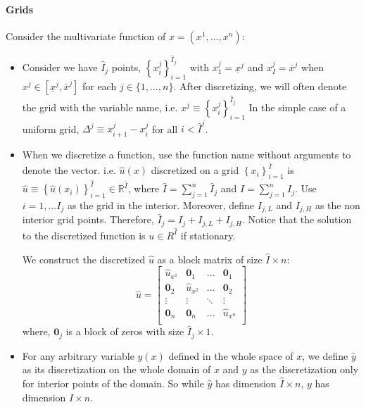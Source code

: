 \documentclass[11pt]{article}
\newcommand{\set}[1]{\ensuremath{\left\{{#1}\right\}}}
\newcommand{\R}{\ensuremath{\mathbb{R}}}
\begin{document}
	\paragraph{Grids}Consider the multivariate function of $x = (x^1,...,x^n )$:
	\begin{itemize}
		\item Consider we have $\hat{I}_j$ points, $\set{x^j_i}_{i=1}^{\hat{I}_j}$%
		 with $x^j_1 = \underline{x}^j$ and $x^j_I = \bar{x}^j$ when $x^j \in [\underline{x}^j, \bar{x}^j]$ for each $j \in \{1,...,n\}$.  After discretizing, we will often denote the grid with the variable name, i.e. $x^j \equiv \set{x^j_i}_{i=1}^{\hat{I}_j}$
		In the simple case of a uniform grid, $\Delta^j \equiv x_{i+1}^j - x_i^j$ for all $i < \hat{I}^j$.
		\item When we discretize a function, use the function name without arguments to denote the vector.  i.e. $\hat{u}(x)$ discretized on a grid $\set{x_i}_{i=1}^{\hat{I}}$  is $\hat{u} \equiv \set{\hat{u}(x_i)}_{i=1}^{\hat{I}} \in \R^{\hat{I}}$, where $\hat{I} = \sum_{j=1}^n \hat{I}_j$ and $I = \sum_{j = 1}^n I_j$.
		Use $i=1,... I_j$ as the grid in the interior. Moreover, define $I_{j,L}$ and $I_{j,H}$ as the non interior grid points. Therefore, $\hat{I}_j = I_j + I_{j,L} + I_{j,H}$. %
		 Notice that the solution to the discretized function is $u \in R^{\hat{I}}$ if stationary.
		
		We construct the discretized $\hat{u}$ as a block matrix of size $\hat{I}\times n$:
		\begin{equation}
		\hat{u} = \begin{bmatrix}
		\hat{u}_{x^1} & \mathbf{0}_1       & ...    & \mathbf{0}_1\\
		\mathbf{0}_2       & \hat{u}_{x^2} & ...    & \mathbf{0}_2\\
		\vdots  & \vdots  & \ddots & \vdots \\
		\mathbf{0}_n       & \mathbf{0}_n       & ...    & \hat{u}_{x^n}\\
		\end{bmatrix}\label{u_def}
		\end{equation}
		where, $\mathbf{0}_j$ is a block of zeros with size $\hat{I}_j \times 1$.
		
		
		
		\item For any arbitrary variable $y(x)$ defined in the whole space of $x$, we define $\hat{y}$ as its discretization on the whole domain of $x$ and $y$ as the discretization only for interior points of the domain. So while $\hat{y}$ has dimension $\hat{I} \times n$, $y$ has dimension $I \times n$.
	\end{itemize}
	
\end{document}
